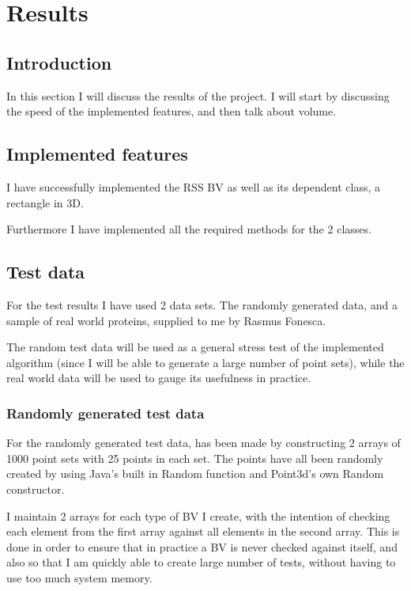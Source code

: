 
\section{Results}
\label{results}
\subsection{Introduction}
In this section I will discuss the results of the project. I will start by discussing the speed of the implemented features, and then talk about volume.

\subsection{Implemented features}
I have successfully implemented the RSS BV as well as its dependent class, a rectangle in 3D. 

Furthermore I have implemented all the required methods for the 2 classes.

\subsection{Test data}
For the test results I have used 2 data sets. The randomly generated data, and a sample of real world proteins, supplied to me by Rasmus Fonesca.

The random test data will be used as a general stress test of the implemented algorithm (since I will be able to generate a large number of point sets), while the real world data will be used to gauge its usefulness in practice.

\subsubsection{Randomly generated test data}
For the randomly generated test data, has been made by constructing 2 arrays of 1000 point sets with 25 points in each set. The points have all been randomly created by using Java's built in Random function and Point3d's own Random constructor.

I maintain 2 arrays for each type of BV I create, with the intention of checking each element from the first array against all elements in the second array. This is done in order to ensure that in practice a BV is never checked against itself, and also so that I am quickly able to create large number of tests, without having to use too much system memory. \\ 

